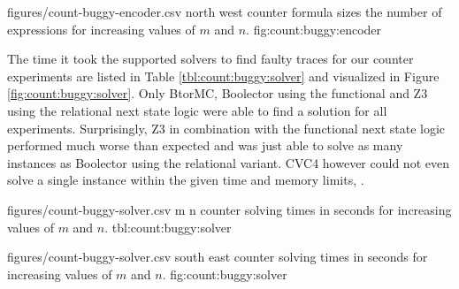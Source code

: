 \newpage

\EncoderStatsGraph
  {figures/count-buggy-encoder.csv}
  {north west}
  { counter formula sizes  the number of expressions for increasing values of $m$ and $n$.}
  {fig:count:buggy:encoder}

The time it took the supported solvers to find faulty traces for our  counter experiments are listed in Table \ref{tbl:count:buggy:solver} and visualized in Figure \ref{fig:count:buggy:solver}.
Only BtorMC, Boolector using the functional and Z3 using the relational next state logic were able to find a solution for all experiments.
Surprisingly, Z3 in combination with the functional next state logic performed much worse than expected and was just able to solve as many instances as Boolector using the relational variant.
CVC4 however could not even solve a single instance within the given time and memory limits, .

\bigbreak

\SolverStatsTable
  {figures/count-buggy-solver.csv}
  {m n}
  {\CountRowHeader}
  { counter solving times in seconds for increasing values of $m$ and $n$.}
  {tbl:count:buggy:solver}

\newpage

\SolverStatsGraph
  {figures/count-buggy-solver.csv}
  {south east}
  { counter solving times in seconds for increasing values of $m$ and $n$.}
  {fig:count:buggy:solver}


